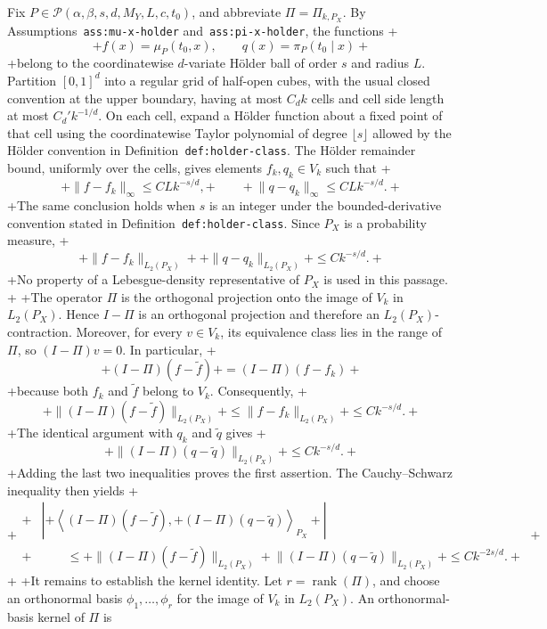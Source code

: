 Fix \(P\in\mathcal P(\alpha,\beta,s,d,M_Y,L,c,t_0)\), and abbreviate \(\Pi=\Pi_{k,P_X}\). By Assumptions~\texttt{ass:mu-x-holder} and~\texttt{ass:pi-x-holder}, the functions
+\[
+f(x)=\mu_P(t_0,x),\qquad q(x)=\pi_P(t_0\mid x)
+\]
+belong to the coordinatewise \(d\)-variate H\"older ball of order \(s\) and radius \(L\). Partition \([0,1]^d\) into a regular grid of half-open cubes, with the usual closed convention at the upper boundary, having at most \(C_d k\) cells and cell side length at most \(C_d'k^{-1/d}\). On each cell, expand a H\"older function about a fixed point of that cell using the coordinatewise Taylor polynomial of degree \(\lfloor s\rfloor\) allowed by the H\"older convention in Definition~\texttt{def:holder-class}. The H\"older remainder bound, uniformly over the cells, gives elements \(f_k,q_k\in V_k\) such that
+\[
+\lVert f-f_k\rVert_\infty\le C L k^{-s/d},
+\qquad
+\lVert q-q_k\rVert_\infty\le C L k^{-s/d}.
+\]
+The same conclusion holds when \(s\) is an integer under the bounded-derivative convention stated in Definition~\texttt{def:holder-class}. Since \(P_X\) is a probability measure,
+\[
+\lVert f-f_k\rVert_{L_2(P_X)}+
+\lVert q-q_k\rVert_{L_2(P_X)}
+\le C k^{-s/d}.
+\]
+No property of a Lebesgue-density representative of \(P_X\) is used in this passage.
+
+The operator \(\Pi\) is the orthogonal projection onto the image of \(V_k\) in \(L_2(P_X)\). Hence \(I-\Pi\) is an orthogonal projection and therefore an \(L_2(P_X)\)-contraction. Moreover, for every \(v\in V_k\), its equivalence class lies in the range of \(\Pi\), so \((I-\Pi)v=0\). In particular,
+\[
+(I-\Pi)(f-\widetilde f)
+=(I-\Pi)(f-f_k)
+\]
+because both \(f_k\) and \(\widetilde f\) belong to \(V_k\). Consequently,
+\[
+\lVert(I-\Pi)(f-\widetilde f)\rVert_{L_2(P_X)}
+\le \lVert f-f_k\rVert_{L_2(P_X)}
+\le Ck^{-s/d}.
+\]
+The identical argument with \(q_k\) and \(\widetilde q\) gives
+\[
+\lVert(I-\Pi)(q-\widetilde q)\rVert_{L_2(P_X)}
+\le Ck^{-s/d}.
+\]
+Adding the last two inequalities proves the first assertion. The Cauchy--Schwarz inequality then yields
+\[
+\begin{aligned}
+&\left\lvert
+\left\langle(I-\Pi)(f-\widetilde f),
+(I-\Pi)(q-\widetilde q)\right\rangle_{P_X}
+\right\rvert\\
+&\qquad\le
+\lVert(I-\Pi)(f-\widetilde f)\rVert_{L_2(P_X)}
+\lVert(I-\Pi)(q-\widetilde q)\rVert_{L_2(P_X)}
+\le Ck^{-2s/d}.
+\end{aligned}
+\]
+
+It remains to establish the kernel identity. Let \(r=\operatorname{rank}(\Pi)\), and choose an orthonormal basis \(\phi_1,\ldots,\phi_r\) for the image of \(V_k\) in \(L_2(P_X)\). An orthonormal-basis kernel of \(\Pi\) is
